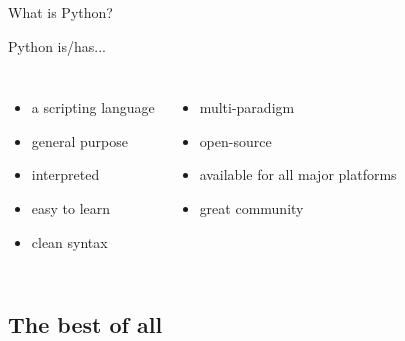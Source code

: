 \begin{frame}{What is Python?}

Python is/has...

\begin{columns}[t]


\begin{itemize}
    \item a scripting language
    \item general purpose
    \item interpreted
    \item easy to learn
    \item clean syntax
\end{itemize}


\begin{itemize}
    \item multi-paradigm
    \item open-source
    \item available for all major platforms
    \item great community
\end{itemize}

\end{columns}

\end{frame}


\subsection{The best of all}


